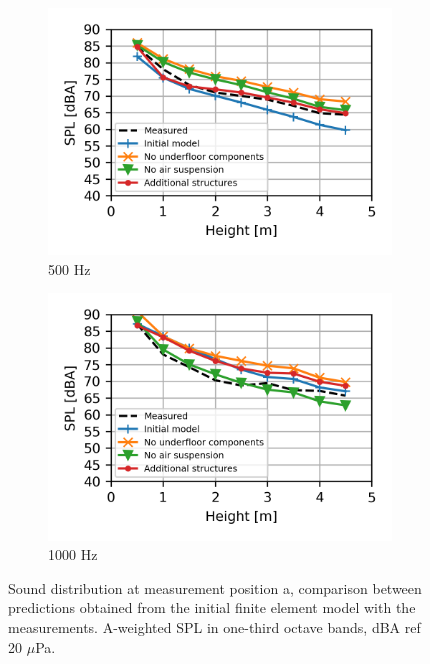 \begin{figure}[H]
	\begin{subfigure}[b]{0.49\textwidth}
		\centering
		\includegraphics{fig/chap5/geometry_variation/third_octave_over_height/500_Hz.png}
		\caption{500 Hz}
	\end{subfigure}
	\begin{subfigure}[b]{0.49\textwidth}
		\centering
		\includegraphics{fig/chap5/geometry_variation/third_octave_over_height/1000_Hz.png}
		\caption{1000 Hz}
	\end{subfigure}
	\caption{Sound distribution at measurement position a, comparison between predictions obtained from the initial finite element model with the measurements. A-weighted SPL in one-third octave bands, dBA ref 20 $\mu$Pa.}
	\label{fig:third_octave_over_height_geometry_variation}
\end{figure}

